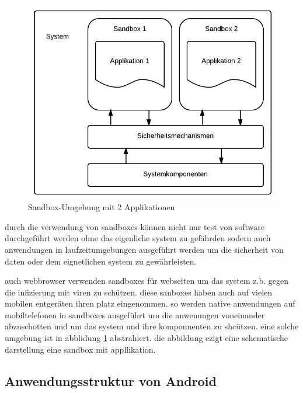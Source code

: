 \begin{center}
\begin{figure}
\includegraphics[scale=0.6]{images/sandbox}
\caption{Sandbox-Umgebung mit 2 Applikationen}
\label{sandbox}
\end{figure}
\end{center}

durch die verwendung von sandboxes können nicht nur test von software durchgeführt werden ohne das eigenliche system zu gefährden sodern auch anwendungen in laufzeitumgebungen ausgeführt werden um die sicherheit von daten oder dem eignetlichen system zu gewährleisten. 

auch webbrowser verwenden sandboxes für webseiten um das  system z.b. gegen die infizierung mit viren zu schützen. diese sanboxes haben auch auf vielen mobilen entgeräten ihren platz eingenommen. so werden native anwendungen auf mobiltelefonen in sandboxes ausgeführt um die anwenungen voneinander abzuschotten und um das system und ihre komponnenten zu shcützen. eine solche umgebung ist in abblidung \ref{sandbox} abstrahiert. die abbildung ezigt eine schematische darstellung eine sandbox mit appllikation.

\subsection{Anwendungsstruktur von Android}